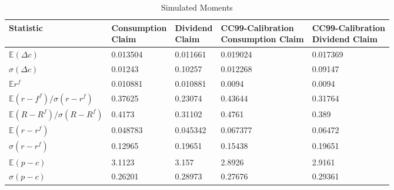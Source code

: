 \begin{table}[H]
\centering
\caption{Simulated Moments}
\label{tab:simmom}
\begin{tabular}{@{}lllll@{}}
\toprule
Statistic                                               & \makecell{Consumption \\ Claim} & \makecell{Dividend \\ Claim} & \makecell{CC99-Calibration \\ Consumption Claim} & \makecell{CC99-Calibration\\ Dividend Claim} \\ \midrule
$\mathbb{E}\left(\Delta c \right)$                      &0.013504&0.011661&0.019024&0.017369\\
$\sigma\left(\Delta c \right)$                          &0.01243&0.10257&0.012268&0.09147\\
$\mathbb{E}r^f$                                         &0.010881&0.010881&0.0094&0.0094\\
$\mathbb{E}\left(r-f^f\right)/\sigma\left(r-r^f\right)$ &0.37625&0.23074& 0.43644                                       &         0.31764                            \\
$\mathbb{E}\left(R-R^f\right)/\sigma\left(R-R^f\right)$ & 0.4173   & 0.31102               &  0.4761                                      &      0.389                               \\
$\mathbb{E}\left(r-r^f\right)$                          &  0.048783                 &      0.045342          &         0.067377                               &        0.06472                             \\
$\sigma\left(r-r^f\right)$                              &     0.12965              &       0.19651           &   0.15438                                       &                  0.19651                     \\
$\mathbb{E}\left(p-c\right)$                          &     3.1123                &      3.157            &         2.8926                                 &             2.9161                          \\
$\sigma\left(p-c\right)$                              &       0.26201            &      0.28973          &   0.27676                                     & 0.29361                                    \\ \bottomrule
\end{tabular}
\end{table}
